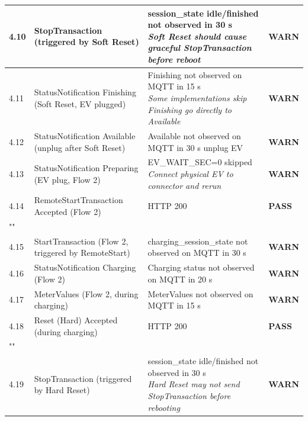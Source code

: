 \documentclass[10pt, a4paper]{article}
\begin{document}
\begin{longtable}{|L{1cm}|L{5.5cm}|M{7cm}|C{1.8cm}|}
\hline
\small 4.10 & \small StopTransaction (triggered by Soft Reset) & session\_state idle/finished not observed in 30 s{\newline\normalfont\footnotesize\itshape Soft Reset should cause graceful StopTransaction before reboot} & \textcolor{warnorange}{\textbf{WARN}} \\
\hline
\small 4.11 & \small StatusNotification Finishing (Soft Reset, EV plugged) & Finishing not observed on MQTT in 15 s{\newline\normalfont\footnotesize\itshape Some implementations skip Finishing  go directly to Available} & \textcolor{warnorange}{\textbf{WARN}} \\
\hline
\small 4.12 & \small StatusNotification Available (unplug after Soft Reset) & Available not observed on MQTT in 30 s  unplug EV & \textcolor{warnorange}{\textbf{WARN}} \\
\hline
\small 4.13 & \small StatusNotification Preparing (EV plug, Flow 2) & EV\_WAIT\_SEC=0  skipped{\newline\normalfont\footnotesize\itshape Connect physical EV to connector and rerun} & \textcolor{warnorange}{\textbf{WARN}} \\
\hline
\small 4.14 & \small RemoteStartTransaction  Accepted (Flow 2) & HTTP 200 & \textcolor{passgreen}{\textbf{PASS}} \\
\hline
{} \\
\hline
\small 4.15 & \small StartTransaction (Flow 2, triggered by RemoteStart) & charging\_session\_state not observed on MQTT in 30 s & \textcolor{warnorange}{\textbf{WARN}} \\
\hline
\small 4.16 & \small StatusNotification Charging (Flow 2) & Charging status not observed on MQTT in 20 s & \textcolor{warnorange}{\textbf{WARN}} \\
\hline
\small 4.17 & \small MeterValues (Flow 2, during charging) & MeterValues not observed on MQTT in 15 s & \textcolor{warnorange}{\textbf{WARN}} \\
\hline
\small 4.18 & \small Reset (Hard)  Accepted (during charging) & HTTP 200 & \textcolor{passgreen}{\textbf{PASS}} \\
\hline
{} \\
\hline
\small 4.19 & \small StopTransaction (triggered by Hard Reset) & session\_state idle/finished not observed in 30 s{\newline\normalfont\footnotesize\itshape Hard Reset may not send StopTransaction before rebooting} & \textcolor{warnorange}{\textbf{WARN}} \\

\end{longtable}
\end{document}

